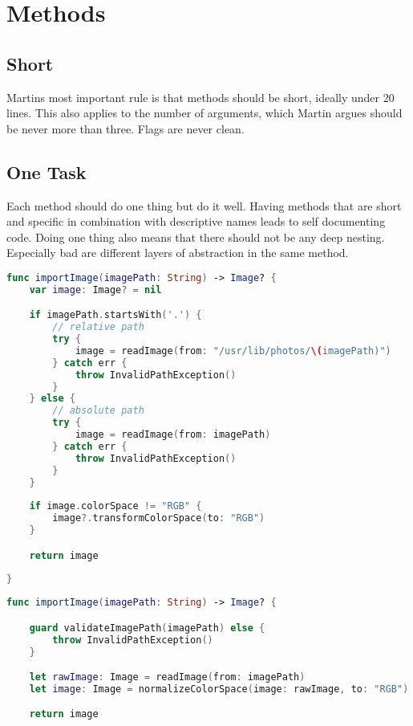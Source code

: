 \section{Methods}

\subsection{Short}
Martins most important rule is that methods should be short, ideally under 20 lines. This also applies to the number of arguments, which Martin argues should be never more than three. Flags are never clean.

\subsection{One Task}
Each method should do one thing but do it well. Having methods that are short and specific in combination with descriptive names leads to self documenting code. Doing one thing also means that there should not be any deep nesting. Especially bad are different layers of abstraction in the same method.

\begin{lstlisting}[language=Swift, caption={Method with more than one task}]
func importImage(imagePath: String) -> Image? {
    var image: Image? = nil

    if imagePath.startsWith('.') {
        // relative path
        try {
            image = readImage(from: "/usr/lib/photos/\(imagePath)")
        } catch err {
            throw InvalidPathException()
        }
    } else {
        // absolute path
        try {
            image = readImage(from: imagePath)
        } catch err {
            throw InvalidPathException()
        }
    }
    
    if image.colorSpace != "RGB" {
        image?.transformColorSpace(to: "RGB")
    }

    return image
    
}
\end{lstlisting}


\begin{lstlisting}[language=Swift, caption={Refactored method that only does one thing: import an image}]
func importImage(imagePath: String) -> Image? {

    guard validateImagePath(imagePath) else {
        throw InvalidPathException()
    }

    let rawImage: Image = readImage(from: imagePath)
    let image: Image = normalizeColorSpace(image: rawImage, to: "RGB")

    return image

\end{lstlisting}

